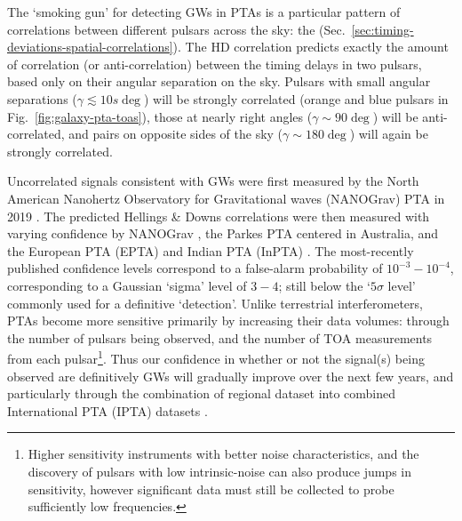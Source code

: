 \documentclass[onecolumn,authoryear]{els-mrw}
\begin{document}
The `smoking gun' for detecting GWs in PTAs is a particular pattern of correlations between different pulsars across the sky: the  (Sec.~\ref{sec:timing-deviations-spatial-correlations}).  The HD correlation predicts exactly the amount of correlation (or anti-correlation) between the timing delays in two pulsars, based only on their angular separation on the sky.  Pulsars with small angular separations ($\gamma \lesssim 10s \deg$) will be strongly correlated (orange and blue pulsars in Fig.~\ref{fig:galaxy-pta-toas}), those at nearly right angles ($\gamma \sim 90 \deg$) will be anti-correlated, and pairs on opposite sides of the sky ($\gamma \sim 180 \deg$) will again be strongly correlated.

Uncorrelated signals consistent with GWs were first measured by the North American Nanohertz Observatory for Gravitational waves (NANOGrav) PTA in 2019 \citep{Arzoumanian+2020}.  The predicted Hellings \& Downs correlations were then measured with varying confidence by NANOGrav \citep{Agazie+2023}, the Parkes PTA \citep[PPTA;][]{Reardon+2023} centered in Australia, and the European PTA (EPTA) and Indian PTA (InPTA) \citep{Antoniadis+2023}.  The most-recently published confidence levels correspond to a false-alarm probability of $10^{-3} - 10^{-4}$, corresponding to a Gaussian `sigma' level of $3-4$; still below the `$5\sigma$ level' commonly used for a definitive `detection'.  Unlike terrestrial interferometers, PTAs become more sensitive primarily by increasing their data volumes: through the number of pulsars being observed, and the number of TOA measurements from each pulsar\footnote{Higher sensitivity instruments with better noise characteristics, and the discovery of pulsars with low intrinsic-noise can also produce jumps in sensitivity, however significant data must still be collected to probe sufficiently low frequencies.}.  Thus our confidence in whether or not the signal(s) being observed are definitively GWs will gradually improve over the next few years, and particularly through the combination of regional dataset into combined International PTA (IPTA) datasets \citep{Antoniadis+2022}.
\end{document}
